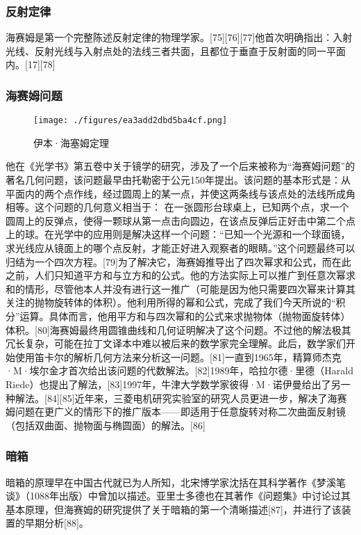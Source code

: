 \subsubsection{反射定律}
海赛姆是第一个完整陈述反射定律的物理学家。[75][76][77]他首次明确指出：入射光线、反射光线与入射点处的法线三者共面，且都位于垂直于反射面的同一平面内。[17][78]
\subsubsection{海赛姆问题}
\begin{figure}[ht]
\centering
\texttt{[image: ./figures/ea3add2dbd5ba4cf.png]}
\caption{伊本·海塞姆定理} \label{fig_YBH_3}
\end{figure}
他在《光学书》第五卷中关于镜学的研究，涉及了一个后来被称为“海赛姆问题”的著名几何问题，该问题最早由托勒密于公元150年提出。该问题的基本形式是：从平面内的两个点作线，经过圆周上的某一点，并使这两条线与该点处的法线所成角相等。这个问题的几何意义相当于：
在一张圆形台球桌上，已知两个点，求一个圆周上的反弹点，使得一颗球从第一点击向圆边，在该点反弹后正好击中第二个点上的球。在光学中的应用则是解决这样一个问题：“已知一个光源和一个球面镜，求光线应从镜面上的哪个点反射，才能正好进入观察者的眼睛。”这个问题最终可以归结为一个四次方程。[79]为了解决它，海赛姆推导出了四次幂求和公式，而在此之前，人们只知道平方和与立方和的公式。他的方法实际上可以推广到任意次幂求和的情形，尽管他本人并没有进行这一推广（可能是因为他只需要四次幂来计算其关注的抛物旋转体的体积）。他利用所得的幂和公式，完成了我们今天所说的“积分”运算。具体而言，他用平方和与四次幂和的公式来求抛物体（抛物面旋转体）体积。[80]海赛姆最终用圆锥曲线和几何证明解决了这个问题。不过他的解法极其冗长复杂，可能在拉丁文译本中难以被后来的数学家完全理解。此后，数学家们开始使用笛卡尔的解析几何方法来分析这一问题。[81]一直到1965年，精算师杰克·M·埃尔金才首次给出该问题的代数解法。[82]1989年，哈拉尔德·里德（Harald Riede）也提出了解法，[83]1997年，牛津大学数学家彼得·M·诺伊曼给出了另一种解法。[84][85]近年来，三菱电机研究实验室的研究人员更进一步，解决了海赛姆问题在更广义的情形下的推广版本——即适用于任意旋转对称二次曲面反射镜（包括双曲面、抛物面与椭圆面）的解法。[86]
\subsubsection{暗箱}
暗箱的原理早在中国古代就已为人所知，北宋博学家沈括在其科学著作《梦溪笔谈》（1088年出版）中曾加以描述。亚里士多德也在其著作《问题集》中讨论过其基本原理，但海赛姆的研究提供了关于暗箱的第一个清晰描述[87]，并进行了该装置的早期分析[88]。

